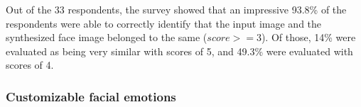 Out of the 33 respondents, the survey showed that an impressive 93.8\% of the respondents were able to correctly identify that the input image and the synthesized face image belonged to the same  ($score >= 3$). Of those, 14\% were evaluated as being very similar with scores of 5, and 49.3\% were evaluated with scores of 4. %


\subsubsection{Customizable facial emotions}